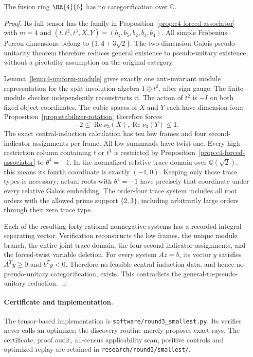 \begin{theorem}\label{thm:c4-multiplicity-four}
The fusion ring $\RR{4}{6}$ has no categorification over $\mathbb C$.
\end{theorem}
\begin{proof}
Its full tensor has the family in
Proposition~\ref{prop:c4-forced-associator} with $m=4$ and
$(t,t^2,t^3,X,Y)=(b_1,b_5,b_2,b_3,b_4)$.
All simple Frobenius--Perron dimensions belong to
$\{1,4+3\sqrt2\}$. The two-dimension Galois-pseudo-unitarity
theorem therefore reduces general existence to pseudo-unitary
existence, without a pivotality assumption on the original category.

Lemma~\ref{lem:c4-uniform-module} gives exactly one anti-invariant
module representation for the split involution algebra $1\oplus t^2$,
after sign gauge. The finite module checker independently reconstructs it.
The action of $t^2$ is $-I$ on both fixed-object coordinates.
The cubic spaces of $X$ and $Y$ each have dimension four;
Proposition~\ref{prop:stabilizer-rotation} therefore forces
\[
 -2\leq\operatorname{Re}\nu_3(X),
          \operatorname{Re}\nu_3(Y)\leq1.
\]
The exact central-induction calculation has ten low frames and
four second-indicator assignments per frame. All low summands
have twist one. Every high restriction column containing $t$ or
$t^3$ is restricted by Proposition~\ref{prop:c4-forced-associator}
to $\theta^4=-1$. In the normalized relative-trace domain over
$\mathbb Q(\sqrt2)$, this means its fourth coordinate is exactly
$(-1,0)$. Keeping only those trace types is necessary; actual roots
with $\theta^4=-1$ have precisely that coordinate under every
relative Galois embedding. The order-four trace system includes
all root orders with the allowed prime support $\{2,3\}$,
including arbitrarily large orders through their zero trace type.

Each of the resulting forty rational nonnegative systems has a
recorded integral separating vector. Verification reconstructs
the low frames, the unique module branch, the entire joint trace
domain, the four second-indicator assignments, and the forced-twist
variable deletion. For every system $Az=b$, its vector $y$
satisfies $A^Ty\geq0$ and $b^Ty<0$. Therefore no feasible central
induction data, and hence no pseudo-unitary categorification,
exists. This contradicts the general-to-pseudo-unitary reduction.
\end{proof}

\paragraph{Certificate and implementation.}
The tensor-based implementation is
\texttt{software/round3\_smallest.py}. Its verifier never calls
an optimizer; the discovery routine merely proposes exact rays.
The certificate, proof audit, all-census applicability scan,
positive controls and optimized replay are retained in
\texttt{research/round3/smallest/}.
